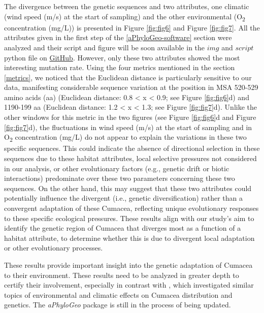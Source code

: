 {The divergence between the genetic sequences and two attributes, one climatic (wind speed (m/s) at the start of sampling) and the other environmental (O\textsubscript{2} concentration (mg/L)) is presented in Figure \ref{fig:fig6} and Figure \ref{fig:fig7}. All the attributes given in the first step of the \autoref{aPhyloGeo-software} section were analyzed and their script and figure will be soon available in the $img$ and $script$ python file on \href{https://github.com/tahiri-lab/Cumacea_aPhyloGeo}{GitHub}. However, only these two attributes showed the most interesting mutation rate. Using the four metrics mentioned in the section \autoref{metrics}, we noticed that the Euclidean distance is particularly sensitive to our data, manifesting considerable sequence variation at the position in MSA 520-529 amino acids (aa) (Euclidean distance: 0.8 < x < 0.9; see Figure \ref{fig:fig6}d) and 1190-199 aa (Euclidean distance: 1.2 < x < 1.3; see Figure \ref{fig:fig7}d). Unlike the other windows for this metric in the two figures (see Figure \ref{fig:fig6}d and Figure \ref{fig:fig7}d), the fluctuations in wind speed (m/s) at the start of sampling and in O\textsubscript{2} concentration (mg/L) do not appear to explain the variations in these two specific sequences. This could indicate the absence of directional selection in these sequences due to these habitat attributes, local selective pressures not considered in our analysis, or other evolutionary factors (e.g., genetic drift or biotic interactions) predominate over these two parameters concerning these two sequences. On the other hand, this may suggest that these two attributes could potentially influence the divergent (i.e., genetic diversification) rather than a convergent adaptation of these Cumacea, reflecting unique evolutionary responses to these specific ecological pressures. These results align with our study's aim to identify the genetic region of Cumacea that diverges most as a function of a habitat attribute, to determine whether this is due to divergent local adaptation or other evolutionary processes.

These results provide important insight into the genetic adaptation of Cumacea to their environment. These results need to be analyzed in greater depth to certify their involvement, especially in contrast with \citep{uhlir_adding_2021}, which investigated similar topics of environmental and climatic effects on Cumacea distribution and genetics. The \textit{aPhyloGeo} package is still in the process of being updated.

}
